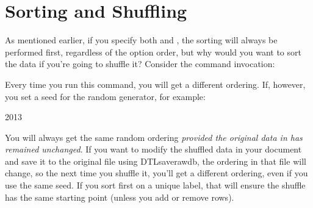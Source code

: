 \section{Sorting and Shuffling}\label{sec:sortshuffle}

As mentioned earlier, if you specify both  and
, the sorting will always be performed first, 
regardless of the option order, but why would you want to sort the data
if you're going to shuffle it? Consider the command invocation:
\begin{terminal}
     
\end{terminal}
Every time you run this command, you will get a different ordering.
If, however, you set a seed for the random generator, for example:
\begin{terminal}
  2013     
\end{terminal}
You will always get the same random ordering \emph{provided the original 
data in  has remained unchanged}. If you want to 
modify the shuffled data in your document and save it to the original 
file  using \gls{DTLsaverawdb}, the ordering in 
that file will change, so the next time you shuffle it, you'll get 
a different ordering, even if you use the same seed. If you sort
first on a unique label, that will ensure the shuffle has the same 
starting point (unless you add or remove rows).

